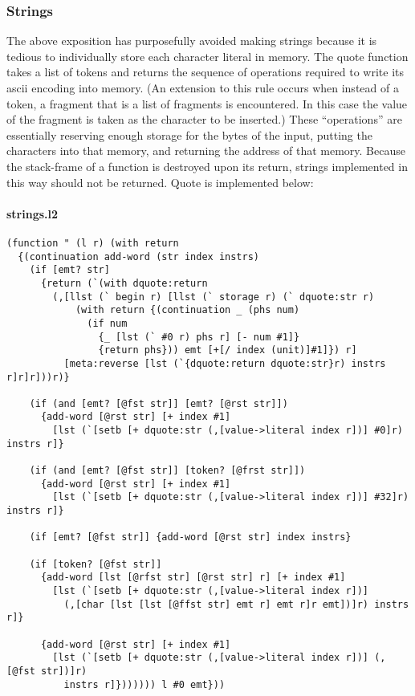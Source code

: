 \documentclass[]{article}
\let\oldparagraph\paragraph
\renewcommand{\paragraph}[1]{\oldparagraph{#1}\mbox{}}
\begin{document}
\hypertarget{strings}{\subsubsection{Strings}\label{strings}}

The above exposition has purposefully avoided making strings because it
is tedious to individually store each character literal in memory. The
quote function takes a list of tokens and returns the sequence of
operations required to write its ascii encoding into memory. (An
extension to this rule occurs when instead of a token, a fragment that
is a list of fragments is encountered. In this case the value of the
fragment is taken as the character to be inserted.) These ``operations''
are essentially reserving enough storage for the bytes of the input,
putting the characters into that memory, and returning the address of
that memory. Because the stack-frame of a function is destroyed upon its
return, strings implemented in this way should not be returned. Quote is
implemented below:

\paragraph{strings.l2}\label{strings.l2}

\begin{verbatim}
(function " (l r) (with return
  {(continuation add-word (str index instrs)
    (if [emt? str]
      {return (`(with dquote:return
        (,[llst (` begin r) [llst (` storage r) (` dquote:str r)
            (with return {(continuation _ (phs num)
              (if num
                {_ [lst (` #0 r) phs r] [- num #1]}
                {return phs})) emt [+[/ index (unit)]#1]}) r]
          [meta:reverse [lst (`{dquote:return dquote:str}r) instrs r]r]r]))r)}
    
    (if (and [emt? [@fst str]] [emt? [@rst str]])
      {add-word [@rst str] [+ index #1]
        [lst (`[setb [+ dquote:str (,[value->literal index r])] #0]r) instrs r]}
        
    (if (and [emt? [@fst str]] [token? [@frst str]])
      {add-word [@rst str] [+ index #1]
        [lst (`[setb [+ dquote:str (,[value->literal index r])] #32]r) instrs r]}
    
    (if [emt? [@fst str]] {add-word [@rst str] index instrs}
        
    (if [token? [@fst str]]
      {add-word [lst [@rfst str] [@rst str] r] [+ index #1]
        [lst (`[setb [+ dquote:str (,[value->literal index r])]
          (,[char [lst [lst [@ffst str] emt r] emt r]r emt])]r) instrs r]}
      
      {add-word [@rst str] [+ index #1]
        [lst (`[setb [+ dquote:str (,[value->literal index r])] (,[@fst str])]r)
          instrs r]})))))) l #0 emt}))
\end{verbatim}
\end{document}
